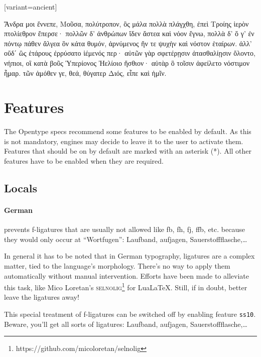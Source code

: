 \documentclass[pagesize,DIV14]{scrartcl}
\begin{document}
\begin{multicols}{2}
\begin{greek}[variant=ancient]
    {
    Ἄνδρα μοι ἔννεπε, Μοῦσα, πολύτροπον, ὃς μάλα πολλὰ
    πλάγχθη, ἐπεὶ Τροίης ἱερὸν πτολίεθρον ἔπερσε·
    πολλῶν δ’ ἀνθρώπων ἴδεν ἄστεα καὶ νόον ἔγνω,
    πολλὰ δ’ ὅ γ’ ἐν πόντῳ πάθεν ἄλγεα ὃν κάτα θυμόν,
    ἀρνύμενος ἥν τε ψυχὴν καὶ νόστον ἑταίρων.
    ἀλλ’ οὔδ΄ ὣς ἑτάρους ἐρρύσατο ἱέμενός περ·
    αὐτῶν γὰρ σφετέρῃσιν ἀτασθαλίῃσιν ὄλοντο,
    νήπιοι, οἳ κατὰ βοῦς Ὑπερίονος Ἠελίοιο
    ἤσθιον· αὐτὰρ ὃ τοῖσιν ἀφείλετο νόστιμον ἦμαρ.
    τῶν ἁμόθεν γε, θεά, θύγατερ Διός, εἶπε καὶ ἡμῖν. \par

}
\end{greek}

\end{multicols}

\clearpage

\section{Features}

The Opentype specs recommend some features to be enabled by default. As this is not mandatory, engines may decide to leave it to the user to activate them. Features that should be on by default are marked with an asterisk (*). All other features have to be enabled when they are required.

\subsection{Locals}
\paragraph*{German} prevents f-ligatures that are usually not allowed like fb, fh, fj, ffb, etc. because they would only occur at \enquote{Wortfugen}: {Laufband, aufjagen, Sauerstoffflasche,…}\par
In general it has to be noted that in German typography, ligatures are a complex matter, tied to the language’s morphology. There’s no way to apply them automatically without manual intervention. Efforts have been made to alleviate this task, like Mico Loretan’s \textsc{selnolig}\footnote{https://github.com/micoloretan/selnolig} for LuaLaTeX. Still, if in doubt, better leave the ligatures away!\par
This special treatment of f-ligatures can be switched off by enabling feature \texttt{ss10}. Beware, you’ll get all sorts of ligatures:  {Laufband, aufjagen, Sauerstoffflasche,…}
\end{document}
